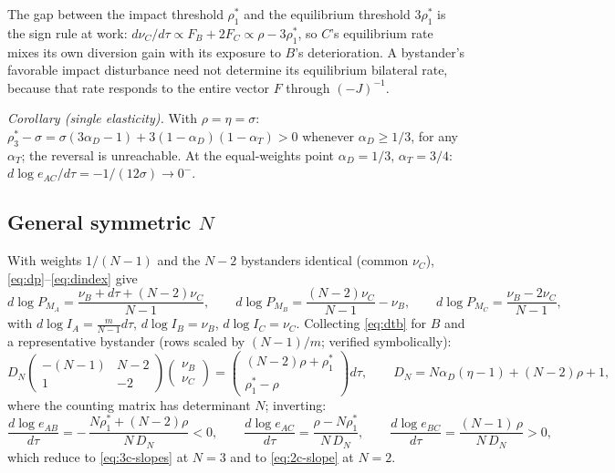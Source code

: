 \documentclass[11pt]{article}
\begin{document}
\noindent The gap between the impact threshold $\rho_1^*$ and the equilibrium threshold $3\rho_1^*$ is the sign rule at work: $d\nu_C/d\tau \propto F_B + 2F_C \propto \rho - 3\rho_1^*$, so $C$'s equilibrium rate mixes its own diversion gain with its exposure to $B$'s deterioration. A bystander's favorable impact disturbance need not determine its equilibrium bilateral rate, because that rate responds to the entire vector $F$ through $(-J)^{-1}$.

\emph{Corollary (single elasticity).} With $\rho = \eta = \sigma$: $\rho_3^* - \sigma = \sigma(3\alpha_D - 1) + 3(1-\alpha_D)(1-\alpha_T) > 0$ whenever $\alpha_D \geq 1/3$, for any $\alpha_T$; the reversal is unreachable. At the equal-weights point $\alpha_D = 1/3$, $\alpha_T = 3/4$: $d\log e_{AC}/d\tau = -1/(12\sigma) \to 0^-$.

\subsection{General symmetric $N$}

With weights $1/(N-1)$ and the $N-2$ bystanders identical (common $\nu_C$), \eqref{eq:dp}--\eqref{eq:dindex} give
\begin{equation}
d\log P_{M_A} = \frac{\nu_B + d\tau + (N-2)\nu_C}{N-1},
\qquad
d\log P_{M_B} = \frac{(N-2)\nu_C}{N-1} - \nu_B,
\qquad
d\log P_{M_C} = \frac{\nu_B - 2\nu_C}{N-1},
\label{eq:N-indices}
\end{equation}
with $d\log I_A = \tfrac{m}{N-1}d\tau$, $d\log I_B = \nu_B$, $d\log I_C = \nu_C$. Collecting \eqref{eq:dtb} for $B$ and a representative bystander (rows scaled by $(N-1)/m$; verified symbolically):
\begin{equation}
D_N
\begin{pmatrix} -(N-1) & N-2 \\ 1 & -2 \end{pmatrix}
\begin{pmatrix} \nu_B \\ \nu_C \end{pmatrix}
=
\begin{pmatrix} (N-2)\rho + \rho_1^* \\ \rho_1^* - \rho \end{pmatrix} d\tau ,
\qquad
D_N = N\alpha_D(\eta-1) + (N-2)\rho + 1 ,
\label{eq:N-system}
\end{equation}
where the counting matrix has determinant $N$; inverting:
\begin{equation}
\frac{d\log e_{AB}}{d\tau}
= -\,\frac{N\rho_1^* + (N-2)\rho}{N\, D_N} < 0,
\qquad
\frac{d\log e_{AC}}{d\tau}
= \frac{\rho - N\rho_1^*}{N\, D_N},
\qquad
\frac{d\log e_{BC}}{d\tau}
= \frac{(N-1)\,\rho}{N\, D_N} > 0 ,
\label{eq:N-slopes}
\end{equation}
which reduce to \eqref{eq:3c-slopes} at $N = 3$ and to \eqref{eq:2c-slope} at $N = 2$.
\end{document}
